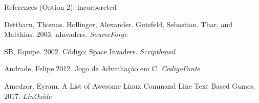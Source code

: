 \documentclass[journal]{IEEEtran}
\begin{document}
References (Option 2): incorporeted
% 
\begin{thebibliography}{10} 
% 
     Dettbarn, Thomas. Hollinger, Alexander.  Gutsfeld, Sebastian. Thar, and Matthias. 2003. nInvaders.
     {\em SourceForge}
 
     SB, Equipe. 2002. Código: Space Invaders.
     {\em Scriptbrasil}
     
 
     Andrade, Felipe.2012. Jogo de Advinhação em C.
    {\em CodigoFonte}
 
     Amedzor, Eyram. A List of Awesome Linux Command Line Text Based Games. 2017.
     {\em LinOxide}
 
 \end{thebibliography}
\end{document}
